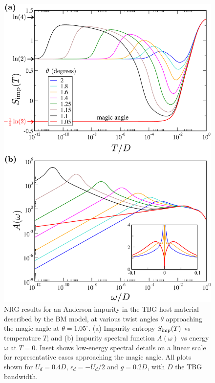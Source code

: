 \begin{figure}[t]
	\includegraphics[width=\linewidth]{figures/chapter2/S_A_vs_th.pdf}
	\caption{
		\small  NRG results for an Anderson impurity in the TBG host material described by the BM model, at various twist angles $\theta$ approaching the magic angle at $\theta=1.05^{\circ}$. 
		(a) Impurity entropy $S_{\rm imp}(T)$ vs temperature $T$; and (b) Impurity spectral function $A(\omega)$ vs energy $\omega$ at $T=0$. Inset shows low-energy spectral details on a linear scale for representative cases approaching the magic angle. All plots shown for $U_d=0.4D$, $\epsilon_d=-U_d/2$ and $g=0.2D$, with $D$ the TBG bandwidth. }
	\label{fig:angles}
\end{figure}

